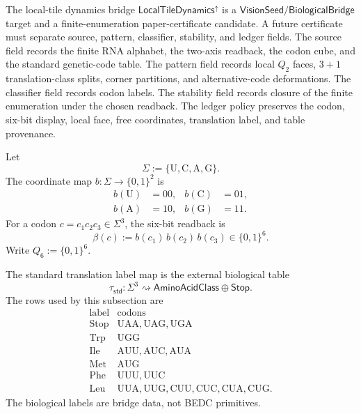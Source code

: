 \begin{definition}
\label{def:philosophy-boundary-tile-bridge-status}
The local-tile dynamics bridge
$\mathsf{LocalTileDynamics}^{\uparrow}$ is a
$\mathsf{VisionSeed}/\mathsf{BiologicalBridge}$ target and a
finite-enumeration paper-certificate candidate. A future certificate must
separate source, pattern, classifier, stability, and ledger fields. The
source field records the finite RNA alphabet, the two-axis readback, the
codon cube, and the standard genetic-code table. The pattern field records
local $Q_{2}$ faces, $3+1$ translation-class splits, corner partitions, and
alternative-code deformations. The classifier field records codon labels.
The stability field records closure of the finite enumeration under the
chosen readback. The ledger policy preserves the codon, six-bit display,
local face, free coordinates, translation label, and table provenance.
\end{definition}

\begin{definition}
\label{def:philosophy-local-tile-rna-window-six-readback}
Let
$$
  \Sigma:=\{\mathrm{U},\mathrm{C},\mathrm{A},\mathrm{G}\}.
$$
The coordinate map $b:\Sigma\to\{0,1\}^{2}$ is
$$
\begin{aligned}
  b(\mathrm{U})&=00,&
  b(\mathrm{C})&=01,\\
  b(\mathrm{A})&=10,&
  b(\mathrm{G})&=11.
\end{aligned}
$$
For a codon $c=c_{1}c_{2}c_{3}\in\Sigma^{3}$, the six-bit readback is
$$
  \beta(c):=b(c_{1})\,b(c_{2})\,b(c_{3})\in\{0,1\}^{6}.
$$
Write $Q_{6}:=\{0,1\}^{6}$.
\end{definition}

\begin{definition}
\label{def:philosophy-standard-translation-label-map}
The standard translation label map is the external biological table
$$
  \tau_{\mathsf{std}}:\Sigma^{3}\rightsquigarrow
  \mathsf{AminoAcidClass}\oplus\mathsf{Stop}.
$$
The rows used by this subsection are
$$
\begin{array}{c|l}
  \text{label} & \text{codons}\\
\hline
  \mathrm{Stop} & \mathrm{UAA},\mathrm{UAG},\mathrm{UGA}\\
  \mathrm{Trp}  & \mathrm{UGG}\\
  \mathrm{Ile}  & \mathrm{AUU},\mathrm{AUC},\mathrm{AUA}\\
  \mathrm{Met}  & \mathrm{AUG}\\
  \mathrm{Phe}  & \mathrm{UUU},\mathrm{UUC}\\
  \mathrm{Leu}  &
    \mathrm{UUA},\mathrm{UUG},\mathrm{CUU},\mathrm{CUC},
    \mathrm{CUA},\mathrm{CUG}.
\end{array}
$$
The biological labels are bridge data, not BEDC primitives.
\end{definition}

